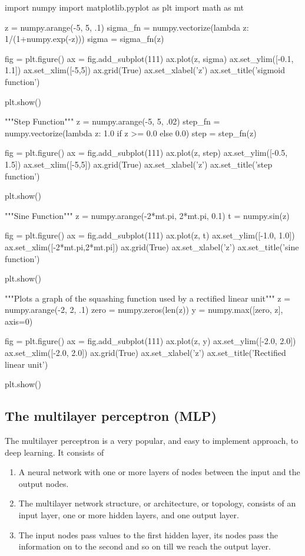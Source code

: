 \documentclass[%
oneside,                 %
final,                   %
10pt]{article}
\begin{document}
import numpy
import matplotlib.pyplot as plt
import math as mt

z = numpy.arange(-5, 5, .1)
sigma_fn = numpy.vectorize(lambda z: 1/(1+numpy.exp(-z)))
sigma = sigma_fn(z)

fig = plt.figure()
ax = fig.add_subplot(111)
ax.plot(z, sigma)
ax.set_ylim([-0.1, 1.1])
ax.set_xlim([-5,5])
ax.grid(True)
ax.set_xlabel('z')
ax.set_title('sigmoid function')

plt.show()

"""Step Function"""
z = numpy.arange(-5, 5, .02)
step_fn = numpy.vectorize(lambda z: 1.0 if z >= 0.0 else 0.0)
step = step_fn(z)

fig = plt.figure()
ax = fig.add_subplot(111)
ax.plot(z, step)
ax.set_ylim([-0.5, 1.5])
ax.set_xlim([-5,5])
ax.grid(True)
ax.set_xlabel('z')
ax.set_title('step function')

plt.show()

"""Sine Function"""
z = numpy.arange(-2*mt.pi, 2*mt.pi, 0.1)
t = numpy.sin(z)

fig = plt.figure()
ax = fig.add_subplot(111)
ax.plot(z, t)
ax.set_ylim([-1.0, 1.0])
ax.set_xlim([-2*mt.pi,2*mt.pi])
ax.grid(True)
ax.set_xlabel('z')
ax.set_title('sine function')

plt.show()

"""Plots a graph of the squashing function used by a rectified linear
unit"""
z = numpy.arange(-2, 2, .1)
zero = numpy.zeros(len(z))
y = numpy.max([zero, z], axis=0)

fig = plt.figure()
ax = fig.add_subplot(111)
ax.plot(z, y)
ax.set_ylim([-2.0, 2.0])
ax.set_xlim([-2.0, 2.0])
ax.grid(True)
ax.set_xlabel('z')
ax.set_title('Rectified linear unit')

plt.show()
\epycod



\subsection{The multilayer  perceptron (MLP)}

The multilayer perceptron is a very popular, and easy to implement approach, to deep learning. It consists of
\begin{enumerate}
\item A neural network with one or more layers of nodes between the input and the output nodes.

\item The multilayer network structure, or architecture, or topology, consists of an input layer, one or more hidden layers, and one output layer.

\item The input nodes pass values to the first hidden layer, its nodes pass the information on to the second and so on till we reach the output layer.
\end{enumerate}
\end{document}
